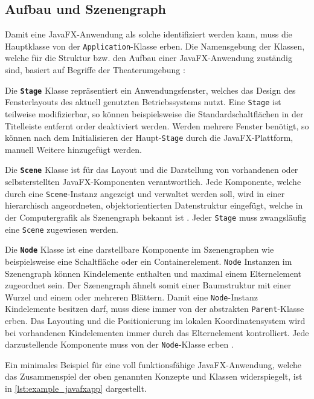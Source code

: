 \subsection{Aufbau und Szenengraph}
\label{javafx_szenengraph}
Damit eine JavaFX-Anwendung als solche identifiziert werden kann, muss die Hauptklasse von der \texttt{Application}-Klasse erben. Die Namensgebung der Klassen, welche für die Struktur bzw. den Aufbau einer JavaFX-Anwendung zuständig sind, basiert auf Begriffe der Theaterumgebung \cite{Anderson2019}:
\begin{description}
	\item Die \textbf{\texttt{Stage}} Klasse repräsentiert ein Anwendungsfenster, welches das Design des Fensterlayouts des aktuell genutzten Betriebssystems nutzt. Eine \texttt{Stage} ist teilweise modifizierbar, so können beispielsweise die Standardschaltflächen in der Titelleiste entfernt order deaktiviert werden. Werden mehrere Fenster benötigt, so können nach dem Initialisieren der Haupt-\texttt{Stage} durch die JavaFX-Plattform, manuell Weitere hinzugefügt werden.
	\item Die \textbf{\texttt{Scene}} Klasse ist für das Layout und die Darstellung von vorhandenen oder selbsterstellten JavaFX-Komponenten verantwortlich. Jede Komponente, welche durch eine \texttt{Scene}-Instanz angezeigt und verwaltet werden soll, wird in einer hierarchisch angeordneten, objektorientierten Datenstruktur eingefügt, welche in der Computergrafik als Szenengraph bekannt ist \cite{Hughes2013}. Jeder \texttt{Stage} muss zwangsläufig eine \texttt{Scene} zugewiesen werden.
	\item Die \textbf{\texttt{Node}} Klasse ist eine darstellbare Komponente im Szenengraphen wie beispielsweise eine Schaltfläche oder ein Containerelement. \texttt{Node} Instanzen im Szenengraph können Kindelemente enthalten und maximal einem Elternelement zugeordnet sein. Der Szenengraph ähnelt somit einer Baumstruktur mit einer Wurzel und einem oder mehreren Blättern. Damit eine \texttt{Node}-Instanz Kindelemente besitzen darf, muss diese immer von der abstrakten \texttt{Parent}-Klasse erben. Das Layouting und die Positionierung im lokalen Koordinatensystem wird bei vorhandenen Kindelementen immer durch das Elternelement kontrolliert. Jede darzustellende Komponente muss von der \texttt{Node}-Klasse erben \cite{Juneau2013}.
\end{description}
Ein minimales Beispiel für eine voll funktionsfähige JavaFX-Anwendung, welche das Zusammenspiel der oben genannten Konzepte und Klassen widerspiegelt, ist in \autoref{lst:example_javafxapp} dargestellt.
